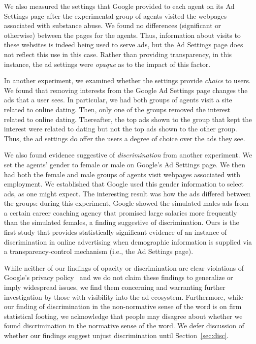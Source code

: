\documentclass{article}
\begin{document}
We also measured the settings that Google provided to each agent on its Ad Settings page after the experimental group of agents visited the webpages associated with substance abuse.  We found no differences (significant or otherwise) between the pages for the agents.  Thus, information about visits to these websites is indeed being used to serve ads, but the Ad Settings page does not reflect this use in this case. Rather than providing transparency, in this instance, the ad settings were \emph{opaque} as to the impact of this factor.



In another experiment, we examined whether the settings provide \emph{choice} to  users.  We found that removing interests from the Google Ad Settings page changes the ads that a user sees.  In particular, we had both groups of agents visit a site related to online dating.  Then, only one of the groups removed the interest related to online dating.  Thereafter, the top ads shown to the group that kept the interest were related to dating but not the top ads shown to the other group. Thus, the ad settings do offer the users a degree of choice over the ads they see.

We also found evidence suggestive of \emph{discrimination} from another experiment.
We set the agents' gender to female or male on Google's Ad Settings page.  We then had both the female and male groups of agents visit webpages associated with employment.  We established that Google used this gender information to select ads, as one might expect. The interesting result was how the ads differed between the groups: during this experiment, Google showed the simulated males ads from a certain career coaching agency that promised large salaries more frequently than the simulated females, a finding suggestive of discrimination. 
Ours is the first study that provides statistically significant evidence of an instance of discrimination in online advertising when demographic information is supplied via a transparency-control mechanism (i.e., the Ad Settings page).


While neither of our findings of opacity or discrimination are clear violations of Google's privacy policy~\cite{google-privacy} and we do not claim these findings to generalize or imply widespread issues, we find them concerning and warranting further investigation by those with visibility into the ad ecosystem.
Furthermore, while our finding of discrimination in the non-normative sense of the word is on firm statistical footing, we acknowledge that people may disagree about whether we found discrimination in the normative sense of the word.  We defer discussion of whether our findings suggest unjust discrimination until Section~\ref{sec:disc}.
\end{document}
